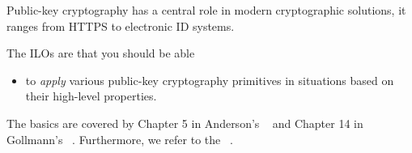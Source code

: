 Public-key cryptography has a central role in modern cryptographic solutions, 
it ranges from HTTPS to electronic ID systems.

The \acp{ILO} are that you should be able
\begin{itemize}
  \item to \emph{apply} various public-key cryptography primitives in 
    situations based on their high-level properties.
\end{itemize}

The basics are covered by
Chapter 5 in Anderson's ~\cite{Anderson2008sea} and
Chapter 14 in Gollmann's ~\cite{Gollmann2011cs}.
Furthermore, we refer to the ~\cite{EOCS}.
